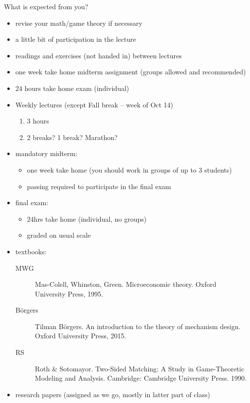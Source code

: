 \documentclass[english]{beamer}		%
\def\lyxframeend{} %
\begin{document}
What is expected from you?
\begin{itemize}
	
	\item revise your math/game theory if necessary
	
	\item a little bit of participation in the lecture
	
	\item readings and exercises (not handed in) between lectures
	
	\item one week take home midterm assignment (groups allowed and recommended)
	
	\item 24 hours take home exam (individual)
	
\end{itemize}
\lyxframeend


\begin{itemize}
	\item Weekly lectures (except Fall break -- week of Oct 14)
	\begin{enumerate}
		\item 3 hours
		\item 2 breaks? 1 break? Marathon?
	\end{enumerate}

	\pause
	\item mandatory midterm:
	\begin{itemize}
		\item one week take home (you should work in groups of up to 3 students)
		\item passing required to participate in the final exam
	\end{itemize}
	
	\item final exam:
	\begin{itemize}
		\item 24hrs take home (individual, no groups)
		\item graded on usual scale
	\end{itemize}
\end{itemize}
\lyxframeend


\begin{itemize}
	\item textbooks:
	\begin{description}
		\item[MWG] Mas-Colell,  Whinston, Green. Microeconomic theory. Oxford University Press, 1995. 
		\item[B\"{o}rgers] Tilman B\"{o}rgers. An introduction to the theory of mechanism design. Oxford University Press, 2015.
		\item[RS] Roth \& Sotomayor. Two-Sided Matching: A Study in Game-Theoretic Modeling and Analysis. Cambridge: Cambridge University Press. 1990. 
	\end{description}
	\item research papers (assigned as we go, mostly in latter part of class)
\end{itemize}
\lyxframeend
\end{document}
